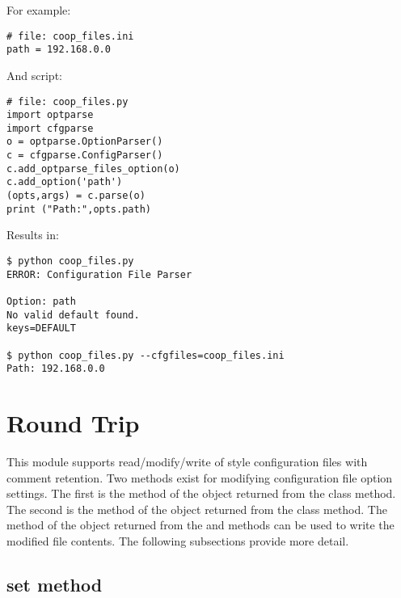 \documentclass{howto}
\begin{document}
For example:

\begin{verbatim}
# file: coop_files.ini
path = 192.168.0.0
\end{verbatim}

And script:

\begin{verbatim}
# file: coop_files.py
import optparse
import cfgparse
o = optparse.OptionParser()
c = cfgparse.ConfigParser()
c.add_optparse_files_option(o)
c.add_option('path')
(opts,args) = c.parse(o)
print ("Path:",opts.path)
\end{verbatim}

Results in:

\begin{verbatim}
$ python coop_files.py
ERROR: Configuration File Parser

Option: path
No valid default found.
keys=DEFAULT

$ python coop_files.py --cfgfiles=coop_files.ini
Path: 192.168.0.0
\end{verbatim}

\section{Round Trip}

This module supports read/modify/write of  style configuration files
with comment retention.  Two methods exist for modifying configuration file
option settings.  The first is the  method of the object returned 
from the  class  method.  The second
is the  method of the object returned from the 
 class  method.  The  method
of the object returned from the  and  methods can be
used to write the modified file contents.  The following subsections provide
more detail.

\subsection{set method\label{cfgparse-round-trip-set}}
\end{document}
